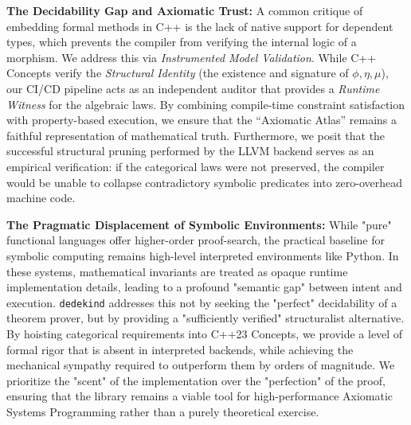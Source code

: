 \documentclass[11pt, a4paper]{report}
\begin{document}
\textbf{The Decidability Gap and Axiomatic Trust:} A common critique of embedding formal methods in C++ is the lack of native support for dependent types, which prevents the compiler from verifying the internal logic of a morphism. We address this via \textit{Instrumented Model Validation}. While C++ Concepts verify the \textit{Structural Identity} (the existence and signature of $\phi, \eta, \mu$), our CI/CD pipeline acts as an independent auditor that provides a \textit{Runtime Witness} for the algebraic laws. By combining compile-time constraint satisfaction with property-based execution, we ensure that the ``Axiomatic Atlas'' remains a faithful representation of mathematical truth. Furthermore, we posit that the successful structural pruning performed by the LLVM backend serves as an empirical verification: if the categorical laws were not preserved, the compiler would be unable to collapse contradictory symbolic predicates into zero-overhead machine code.

\textbf{The Pragmatic Displacement of Symbolic Environments:} While "pure" functional languages offer higher-order proof-search, the practical baseline for symbolic computing remains high-level interpreted environments like Python. In these systems, mathematical invariants are treated as opaque runtime implementation details, leading to a profound "semantic gap" between intent and execution. \texttt{dedekind} addresses this not by seeking the "perfect" decidability of a theorem prover, but by providing a "sufficiently verified" structuralist alternative. By hoisting categorical requirements into C++23 Concepts, we provide a level of formal rigor that is absent in interpreted backends, while achieving the mechanical sympathy required to outperform them by orders of magnitude. We prioritize the "scent" of the implementation over the "perfection" of the proof, ensuring that the library remains a viable tool for high-performance Axiomatic Systems Programming rather than a purely theoretical exercise.
\end{document}
